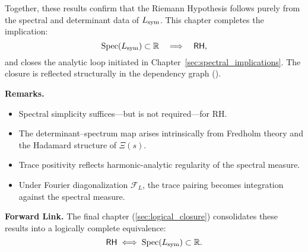 \medskip

Together, these results confirm that the Riemann Hypothesis follows purely from the spectral and determinant data of \( L_{\mathrm{sym}} \). This chapter completes the implication:
\[
\operatorname{Spec}(L_{\mathrm{sym}}) \subset \mathbb{R} \quad \Longrightarrow \quad \mathsf{RH},
\]
and closes the analytic loop initiated in Chapter~\ref{sec:spectral_implications}. The closure is reflected structurally in the dependency graph ().

\medskip

\noindent
\textbf{Remarks.}
\begin{itemize}
  \item Spectral simplicity suffices—but is not required—for RH.
  \item The determinant–spectrum map arises intrinsically from Fredholm theory and the Hadamard structure of \( \Xi(s) \).
  \item Trace positivity reflects harmonic-analytic regularity of the spectral measure.
  \item Under Fourier diagonalization \( \mathcal{F}_L \), the trace pairing becomes integration against the spectral measure.
\end{itemize}

\medskip

\noindent
\textbf{Forward Link.}  
The final chapter (\cref{sec:logical_closure}) consolidates these results into a logically complete equivalence:
\[
\mathsf{RH} \iff \operatorname{Spec}(L_{\mathrm{sym}}) \subset \mathbb{R}.
\]
